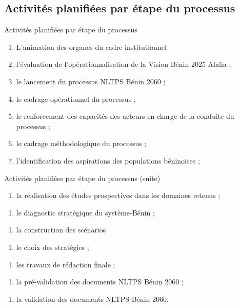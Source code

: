 \documentclass[11pt]{beamer}
\begin{document}
\subsection{\tiny Activités planifiées par étape du processus}
\begin{frame}{Activités planifiées par étape du processus}
  \begin{enumerate} [<+->]
  \item  L’animation des organes du cadre institutionnel  \vfill
 \item  l’évaluation de l’opérationnalisation de la Vision Bénin 2025 Alafia ; \vfill
 \item  le lancement du processus NLTPS Bénin 2060 ; \vfill
 \item  le cadrage opérationnel du processus ; \vfill
\item  le renforcement des capacités des acteurs en charge de la conduite du processus ; \vfill
\item  le cadrage méthodologique du processus ; \vfill
\item  l’identification des aspirations des populations béninoises ; \vfill
 \end{enumerate}
\end{frame}

\begin{frame}{Activités planifiées par étape du processus (suite)}
  \begin{enumerate} [<+->][8]
  \item   la réalisation des études prospectives dans les domaines retenus ;  \vfill
 \end{enumerate}
  \begin{enumerate} [<+->][9]
 \item   le diagnostic stratégique du système-Bénin ; \vfill
 \end{enumerate}
  \begin{enumerate} [<+->][10]
 \item  la construction des scénarios  \vfill
 \end{enumerate}
  \begin{enumerate} [<+->][11]
 \item le choix des stratégies ; \vfill
 \end{enumerate}
  \begin{enumerate} [<+->][12]
\item  les travaux de rédaction finale ; \vfill
 \end{enumerate}
  \begin{enumerate} [<+->][13]
\item  la pré-validation des documents NLTPS Bénin 2060 ; \vfill
 \end{enumerate}
  \begin{enumerate} [<+->][14]
\item  la validation des documents NLTPS Bénin 2060. \vfill
 \end{enumerate}
\end{frame}
\end{document}

